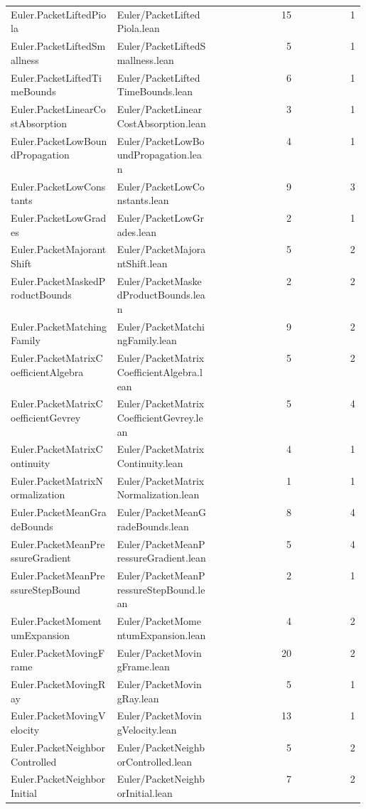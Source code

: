 \begin{longtable}{p{0.30\linewidth}p{0.28\linewidth}rr}
Euler.PacketLiftedPiola & Euler/PacketLiftedPiola.lean & 15 & 1\\
Euler.PacketLiftedSmallness & Euler/PacketLiftedSmallness.lean & 5 & 1\\
Euler.PacketLiftedTimeBounds & Euler/PacketLiftedTimeBounds.lean & 6 & 1\\
Euler.PacketLinearCostAbsorption & Euler/PacketLinearCostAbsorption.lean & 3 & 1\\
Euler.PacketLowBoundPropagation & Euler/PacketLowBoundPropagation.lean & 4 & 1\\
Euler.PacketLowConstants & Euler/PacketLowConstants.lean & 9 & 3\\
Euler.PacketLowGrades & Euler/PacketLowGrades.lean & 2 & 1\\
Euler.PacketMajorantShift & Euler/PacketMajorantShift.lean & 5 & 2\\
Euler.PacketMaskedProductBounds & Euler/PacketMaskedProductBounds.lean & 2 & 2\\
Euler.PacketMatchingFamily & Euler/PacketMatchingFamily.lean & 9 & 2\\
Euler.PacketMatrixCoefficientAlgebra & Euler/PacketMatrixCoefficientAlgebra.lean & 5 & 2\\
Euler.PacketMatrixCoefficientGevrey & Euler/PacketMatrixCoefficientGevrey.lean & 5 & 4\\
Euler.PacketMatrixContinuity & Euler/PacketMatrixContinuity.lean & 4 & 1\\
Euler.PacketMatrixNormalization & Euler/PacketMatrixNormalization.lean & 1 & 1\\
Euler.PacketMeanGradeBounds & Euler/PacketMeanGradeBounds.lean & 8 & 4\\
Euler.PacketMeanPressureGradient & Euler/PacketMeanPressureGradient.lean & 5 & 4\\
Euler.PacketMeanPressureStepBound & Euler/PacketMeanPressureStepBound.lean & 2 & 1\\
Euler.PacketMomentumExpansion & Euler/PacketMomentumExpansion.lean & 4 & 2\\
Euler.PacketMovingFrame & Euler/PacketMovingFrame.lean & 20 & 2\\
Euler.PacketMovingRay & Euler/PacketMovingRay.lean & 5 & 1\\
Euler.PacketMovingVelocity & Euler/PacketMovingVelocity.lean & 13 & 1\\
Euler.PacketNeighborControlled & Euler/PacketNeighborControlled.lean & 5 & 2\\
Euler.PacketNeighborInitial & Euler/PacketNeighborInitial.lean & 7 & 2\\

\end{longtable}
